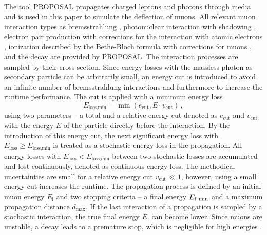 The tool PROPOSAL \cite{koehne2013proposal, dunsch_2018_proposal_improvements} propagates charged leptons and photons through media and is 
used in this paper to simulate the deflection of muons. All relevant muon interaction types 
as bremsstrahlung \cite{KKP_1995, Bremsstrahlung_KKP}, photonuclear interaction \cite{Abramowicz_1997} with 
shadowing \cite{ButkevichMikheyev_2002}, electron pair production \cite{epair_kokoulin_petrukhin} with corrections for the 
interaction with atomic electrons \cite{epair_kelner}, 
ionization described by the Bethe-Bloch formula with corrections for muons \cite{Rossi}, 
and the decay are provided by PROPOSAL. The interaction processes are sampled by their cross section.
Since energy losses
with the massless photon as secondary particle can be arbitrarily small, an energy cut is introduced to avoid an infinite number of bremsstrahlung interactions 
and furthermore to increase the runtime performance. 
The cut is applied with a minimum energy loss
\begin{equation}
    E_{\text{loss,min}} = \min{(e_{\mathrm{cut}}, E \cdot v_{\mathrm{cut}})}\,,
\end{equation}
using two parameters -- a total and a relative energy cut denoted as 
$e_{\mathrm{cut}}$ and $v_{\mathrm{cut}}$ with the energy $E$ of the particle 
directly before the interaction. 
By the introduction of 
this energy cut, the next significant energy loss with 
$E_{\mathrm{loss}} \geq E_{\text{loss,min}}$ 
is treated as a stochastic energy loss in the propagation. 
All energy losses with $E_{\mathrm{loss}} < E_{\text{loss,min}}$ between 
two stochastic losses are accumulated and lost continuously, denoted 
as continuous energy loss.
The methodical uncertainties are small 
for a relative energy cut $v_{\mathrm{cut}}\ll 1$, however, using a small energy 
cut increases the runtime.
The 
propagation process is defined by an initial muon energy $E_{\text{i}}$ and 
two stopping criteria -- a final energy $E_{\text{f,\,min}}$ and a 
maximum propagation distance $d_{\text{max}}$. If the last interaction of 
a propagation is sampled by a stochastic interaction, the true final energy 
$E_{\text{f}}$ can become lower. 
Since muons are unstable, a decay leads to a premature 
stop, which is negligible for high energies 
.

